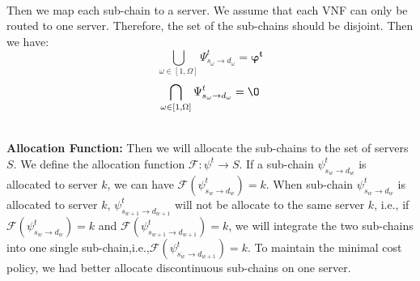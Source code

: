 \documentclass{acmtog}
\begin{document}
\\\indent Then we map each sub-chain to a server. We assume that each VNF can only be routed to one server. Therefore, the set of the sub-chains should be disjoint. Then we have:
$$ \bigcup_{\omega\in[1,\Omega]}\Psi_{s_\omega\rightarrow d_\omega}^t=\boldsymbol{\varphi^t}$$
$$\bigcap_{\omega\in[1,\Omega]}\Psi_{s_\omega\rightarrow d_\omega}^t={\O}$$

\\\noindent\textbf{Allocation Function:} Then we will allocate the sub-chains to the set of servers $S$. We define the allocation function $\mathcal{F}:\psi^t\to S$. If a sub-chain $\psi^t_{s_w \to d_w}$ is allocated to server $k$, we can have $\mathcal{F}(\psi^t_{s_w \to d_w})=k$. When sub-chain $\psi^t_{s_w \to d_w}$ is allocated to server $k$, $\psi^t_{s_{w+1} \to d_{w+1}}$ will not be allocate to the same server $k$, i.e., if $\mathcal{F}(\psi^t_{s_w \to d_w})=k$ and $\mathcal{F}(\psi^t_{s_{w+1} \to d_{w+1}})=k$, we will integrate the two sub-chains into one single sub-chain,i.e.,$\mathcal{F}(\psi^t_{s_w \to d_{w+1}})=k$. To maintain the minimal cost policy, we had better allocate discontinuous sub-chains on one server.
\end{document}
